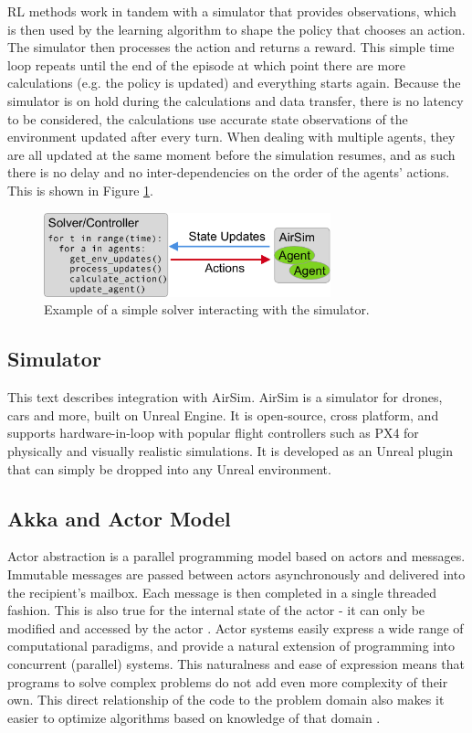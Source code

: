 \documentclass{article}
\let\cite\citep
\begin{document}
RL methods work in tandem with a simulator that provides observations, which is then used by the learning algorithm to shape the policy that chooses an action. The simulator then processes the action and returns a reward. This simple time loop repeats until the end of the episode at which point there are more calculations (e.g. the policy is updated) and everything starts again. Because the simulator is on hold during the calculations and data transfer, there is no latency to be considered, the calculations use accurate state observations of the environment updated after every turn. When dealing with multiple agents, they are all updated at the same moment before the simulation resumes, and as such there is no delay and no inter-dependencies on the order of the agents' actions. This is shown in Figure \ref{fig:naive-solver}.

\begin{figure}[h]
	\centering
	\includegraphics[width=8.31cm]{naive-solver}
	\caption{Example of a simple solver interacting with the simulator.}\label{fig:naive-solver}
\end{figure}

\subsection{Simulator}

This text describes integration with AirSim. AirSim is a simulator for drones, cars and more, built on Unreal Engine. It is open-source, cross platform, and supports hardware-in-loop with popular flight controllers such as PX4 for physically and visually realistic simulations. It is developed as an Unreal plugin that can simply be dropped into any Unreal environment. \cite{shah2018airsim}

\subsection{Akka and Actor Model}
Actor abstraction is a parallel programming model based on actors and messages. Immutable messages are passed between actors asynchronously and delivered into the recipient's mailbox. Each message is then completed in a single threaded fashion. This is also true for the internal state of the actor - it can only be modified and accessed by the actor \cite{scala-Akka-streams}. Actor systems easily express a wide range of computational paradigms, and provide a natural extension of programming into concurrent (parallel) systems. This naturalness and ease of expression means that programs to solve complex problems do not add even more complexity of their own. This direct relationship of the code to the problem domain also makes it easier to optimize algorithms based on knowledge of that domain \cite{actor-foundation}.
\end{document}
